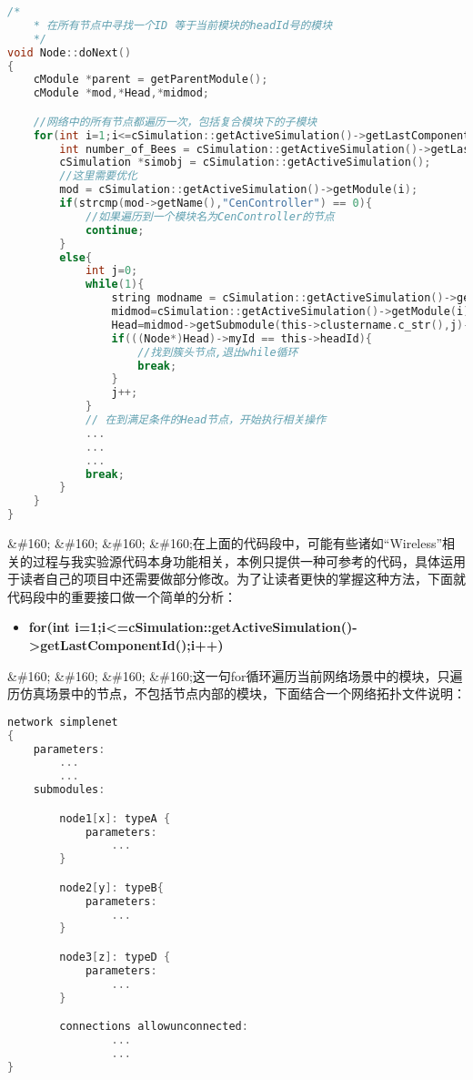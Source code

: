 \begin{lstlisting}[language=c]
/*
    * 在所有节点中寻找一个ID 等于当前模块的headId号的模块
    */
void Node::doNext()
{
    cModule *parent = getParentModule();
    cModule *mod,*Head,*midmod;

    //网络中的所有节点都遍历一次，包括复合模块下的子模块
    for(int i=1;i<=cSimulation::getActiveSimulation()->getLastComponentId();i++){
        int number_of_Bees = cSimulation::getActiveSimulation()->getLastComponentId();
        cSimulation *simobj = cSimulation::getActiveSimulation();
        //这里需要优化
        mod = cSimulation::getActiveSimulation()->getModule(i);
        if(strcmp(mod->getName(),"CenController") == 0){
            //如果遍历到一个模块名为CenController的节点
            continue;
        }
        else{
            int j=0;
            while(1){
                string modname = cSimulation::getActiveSimulation()->getModule(i)->getName();
                midmod=cSimulation::getActiveSimulation()->getModule(i);
                Head=midmod->getSubmodule(this->clustername.c_str(),j)->getSubmodule("Wireless");
                if(((Node*)Head)->myId == this->headId){
                    //找到簇头节点,退出while循环
                    break;
                }
                j++;
            }
            // 在到满足条件的Head节点，开始执行相关操作
            ...
            ...
            ...
            break;
        }
    }
}

\end{lstlisting}

\&\#160; \&\#160; \&\#160; \&\#160;在上面的代码段中，可能有些诸如“Wireless”相关的过程与我实验源代码本身功能相关，本例只提供一种可参考的代码，具体运用于读者自己的项目中还需要做部分修改。为了让读者更快的掌握这种方法，下面就代码段中的重要接口做一个简单的分析：

\begin{itemize}
\item \textbf{for(int i=1;i<=cSimulation::getActiveSimulation()->getLastComponentId();i++)}

\end{itemize}

\&\#160; \&\#160; \&\#160; \&\#160;这一句for循环遍历当前网络场景中的模块，只遍历仿真场景中的节点，不包括节点内部的模块，下面结合一个网络拓扑文件说明：

\begin{lstlisting}[language=c]
network simplenet
{
    parameters:
        ...
        ...
    submodules:

        node1[x]: typeA {
            parameters:
                ...
        }

        node2[y]: typeB{
            parameters:
                ...
        }

        node3[z]: typeD {
            parameters:
                ...
        }

        connections allowunconnected:
                ...
                ...
}

\end{lstlisting}

